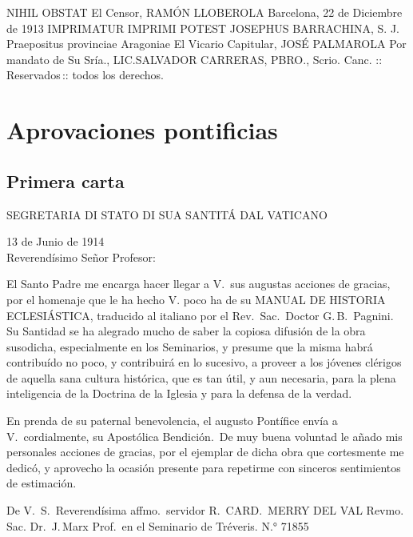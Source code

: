 \raggedbottom{} \documentclass[12pt]{book}
\begin{document}
\noindent NIHIL OBSTAT
El Censor,
RAMÓN LLOBEROLA
Barcelona, 22 de Diciembre de 1913
IMPRIMATUR
IMPRIMI POTEST
JOSEPHUS BARRACHINA, S. J.
Praepositus provinciae Aragoniae
El Vicario Capitular,
JOSÉ PALMAROLA
Por mandato de Su Sría.,
LIC.\@ SALVADOR CARRERAS, PBRO.,
Scrio. Canc.
\quad::\, Reservados\,:: \quad
todos los derechos.
\section{Aprovaciones pontificias}
\subsection{Primera carta}
\begin{center}
  \large SEGRETARIA DI STATO DI SUA SANTITÁ DAL VATICANO
\end{center}
\begin{flushright}
  13 de Junio de 1914\\
  Reverendísimo Señor Profesor:
\end{flushright}

El Santo Padre me encarga hacer llegar a V.\ sus augustas acciones de gracias, por el homenaje que le ha hecho V. poco ha de su MANUAL DE HISTORIA ECLESIÁSTICA, traducido al italiano por el Rev.\, Sac.\, Doctor G.\,B.\, Pagnini. Su Santidad se ha alegrado mucho de saber la copiosa difusión de la obra susodicha, especialmente en los Seminarios, y presume que la misma habrá contribuído no poco, y contribuirá en lo sucesivo, a proveer a los jóvenes clérigos de aquella sana cultura histórica, que es tan útil, y aun necesaria, para la plena inteligencia de la Doctrina de la Iglesia y para la defensa de la verdad.

En prenda de su paternal benevolencia, el augusto Pontífice envía a V.\ cordialmente, su Apostólica Bendición.\  De muy buena voluntad le añado mis personales acciones de gracias, por el ejemplar de dicha obra que cortesmente me dedicó, y aprovecho la ocasión presente para repetirme con sinceros sentimientos de estimación.

De V.\ S.\ Reverendísima affmo.\ servidor
R.\, CARD.\, MERRY DEL VAL
Revmo. Sac. Dr.\, J.\,Marx Prof.\ en el Seminario de Tréveris.
N.° 71855
\end{document}
